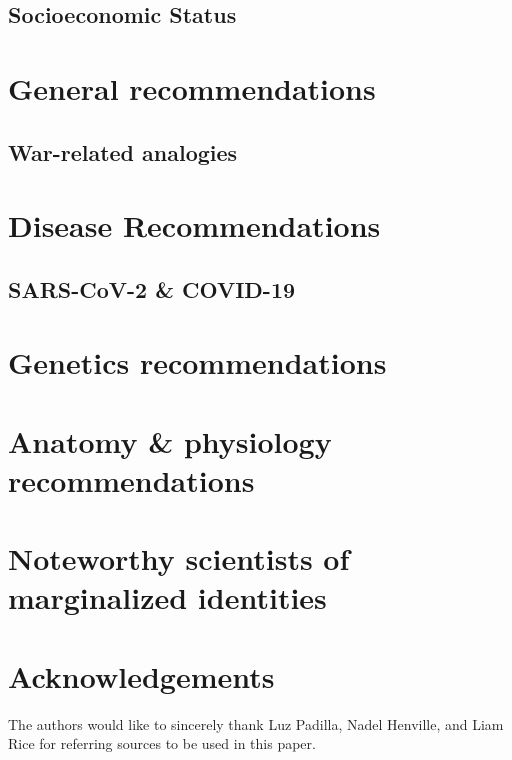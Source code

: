 \documentclass[10pt, twocolumn]{article}
\begin{document}
    \subsection{Socioeconomic Status}

\section{General recommendations}
    
    \subsection{War-related analogies}


\section{Disease Recommendations}

        \subsection{SARS-CoV-2 \& COVID-19}

\section{Genetics recommendations}

\section{Anatomy \& physiology recommendations}

\section{Noteworthy scientists of marginalized identities}

\section*{Acknowledgements}

The authors would like to sincerely thank Luz Padilla, Nadel Henville, and Liam Rice for referring sources to be used in this paper.

\printbibliography
\end{document}
